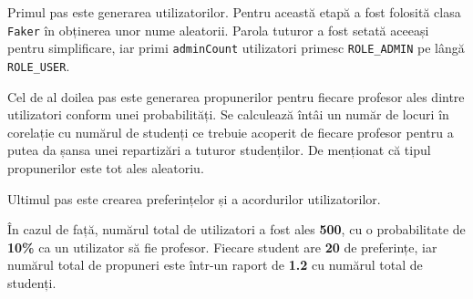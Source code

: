Primul pas este generarea utilizatorilor. Pentru această etapă a fost folosită clasa \texttt{Faker} în obținerea unor nume aleatorii. Parola tuturor a fost setată aceeași pentru simplificare, iar primi \texttt{adminCount} utilizatori primesc \texttt{ROLE\_ADMIN} pe lângă \texttt{ROLE\_USER}.

Cel de al doilea pas este generarea propunerilor pentru fiecare profesor ales dintre utilizatori conform unei probabilități. Se calculează întâi un număr de locuri în corelație cu numărul de studenți ce trebuie acoperit de fiecare profesor pentru a putea da șansa unei repartizări a tuturor studenților. De menționat că tipul propunerilor este tot ales aleatoriu.

Ultimul pas este crearea preferințelor și a acordurilor utilizatorilor.

În cazul de față, numărul total de utilizatori a fost ales \textbf{500}, cu o probabilitate de \textbf{10\%} ca un utilizator să fie profesor. Fiecare student are \textbf{20} de preferințe, iar numărul total de propuneri este într-un raport de \textbf{1.2} cu numărul total de studenți.